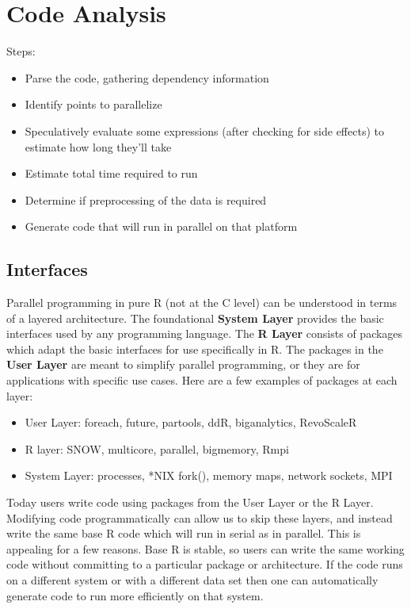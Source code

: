 \documentclass[12pt]{article}
\begin{document}
\section{Code Analysis}

Steps:

\begin{itemize}
    \item Parse the code, gathering dependency information
    \item Identify points to parallelize
    \item Speculatively evaluate some expressions (after checking for side
        effects) to estimate how long they'll
        take
    \item Estimate total time required to run
    \item Determine if preprocessing of the data is required
    \item Generate code that will run in parallel on that platform
\end{itemize}


\subsection{Interfaces}

Parallel programming in pure R (not at the C level) can be understood in
terms of a layered architecture. The foundational \textbf{System Layer}
provides the basic interfaces used by any programming language. The
\textbf{R Layer} consists of packages which adapt the basic interfaces for
use specifically in R. The packages in the \textbf{User Layer} are meant to
simplify parallel programming, or they are for applications with specific
use cases.  Here are a few examples of packages at each layer:

\begin{itemize}
\item User Layer: foreach, future, partools, ddR, biganalytics, RevoScaleR
\item R layer: SNOW, multicore, parallel, bigmemory, Rmpi
\item System Layer: processes, *NIX fork(), memory maps, network sockets,
    MPI
\end{itemize}

Today users write code using packages from the User Layer or the R
Layer. Modifying code programmatically can allow us to skip these layers,
and instead write the same base R code which will run in serial as in
parallel.  This is appealing for a few reasons. Base R is stable, so users
can write the same working code without committing to a particular package
or architecture. If the code runs on a different system or with a different
data set then one can automatically generate code to run more efficiently
on that system.
\end{document}
